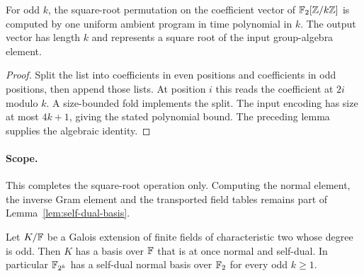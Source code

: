 \begin{lemma}
\label{lem:binary-square-root-program}
\leanok
For odd $k$, the square-root permutation on the coefficient vector of
$\mathbb{F}_2[\mathbb{Z}/k\mathbb{Z}]$ is computed by one uniform ambient program in
time polynomial in $k$. The output vector has length $k$ and represents a
square root of the input group-algebra element.
\end{lemma}
\begin{proof}
\leanok
Split the list into coefficients in even positions and coefficients in odd
positions, then append those lists. At position $i$ this reads the coefficient
at $2i$ modulo $k$. A size-bounded fold implements the split. The input encoding
has size at most $4k+1$, giving the stated polynomial bound. The preceding
lemma supplies the algebraic identity.
\end{proof}
\paragraph{Scope.} This completes the square-root operation only. Computing
the normal element, the inverse Gram element and the transported field tables
remains part of Lemma~\ref{lem:self-dual-basis}.

\begin{lemma}
\label{lem:self-dual-basis-exists}
\leanok
Let $K / \mathbb{F}$ be a Galois extension of finite fields of characteristic two whose degree is odd.
Then $K$ has a basis over $\mathbb{F}$ that is at once normal and self-dual. In particular
$\mathbb{F}_{2^k}$ has a self-dual normal basis over $\mathbb{F}_2$ for every odd $k \geq 1$.
\end{lemma}

